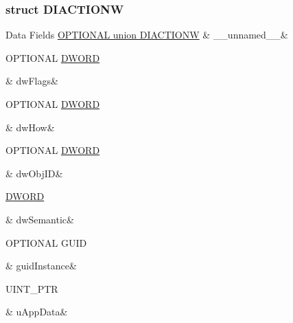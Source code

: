 \subsubsection{struct D\-I\-A\-C\-T\-I\-O\-N\-W}
\begin{DoxyFields}{Data Fields}
\hypertarget{a00003_ad79a61ec14737041ce43bfc890b0d2d2}{\hyperlink{a00003_d7/df7/a00058}{O\-P\-T\-I\-O\-N\-A\-L union D\-I\-A\-C\-T\-I\-O\-N\-W}}\label{a00003_ad79a61ec14737041ce43bfc890b0d2d2}
&
\-\_\-\-\_\-unnamed\-\_\-\-\_\-&
\\
\hline

\hypertarget{a00003_a1badbf389e47c0cd33257c97bd671136}{O\-P\-T\-I\-O\-N\-A\-L \hyperlink{a00003_a50e15ae51c87ae06ab29c8148cb5f36c}{D\-W\-O\-R\-D}}\label{a00003_a1badbf389e47c0cd33257c97bd671136}
&
dw\-Flags&
\\
\hline

\hypertarget{a00003_a16b081e3e54c30045be9fc209e1240ae}{O\-P\-T\-I\-O\-N\-A\-L \hyperlink{a00003_a50e15ae51c87ae06ab29c8148cb5f36c}{D\-W\-O\-R\-D}}\label{a00003_a16b081e3e54c30045be9fc209e1240ae}
&
dw\-How&
\\
\hline

\hypertarget{a00003_a731348d40f8359f7188f74164a32151e}{O\-P\-T\-I\-O\-N\-A\-L \hyperlink{a00003_a50e15ae51c87ae06ab29c8148cb5f36c}{D\-W\-O\-R\-D}}\label{a00003_a731348d40f8359f7188f74164a32151e}
&
dw\-Obj\-I\-D&
\\
\hline

\hypertarget{a00003_a772667ec2df141333fc822a8debf3224}{\hyperlink{a00003_a50e15ae51c87ae06ab29c8148cb5f36c}{D\-W\-O\-R\-D}}\label{a00003_a772667ec2df141333fc822a8debf3224}
&
dw\-Semantic&
\\
\hline

\hypertarget{a00003_a1c98d4f639357b7eec7791319541ba8c}{O\-P\-T\-I\-O\-N\-A\-L G\-U\-I\-D}\label{a00003_a1c98d4f639357b7eec7791319541ba8c}
&
guid\-Instance&
\\
\hline

\hypertarget{a00003_ac83b0c009034bac2df91a2c0bed20494}{U\-I\-N\-T\-\_\-\-P\-T\-R}\label{a00003_ac83b0c009034bac2df91a2c0bed20494}
&
u\-App\-Data&
\\
\hline

\end{DoxyFields}
\label{d7/df7/a00058}
\hypertarget{a00003_d7/df7/a00058}{}

